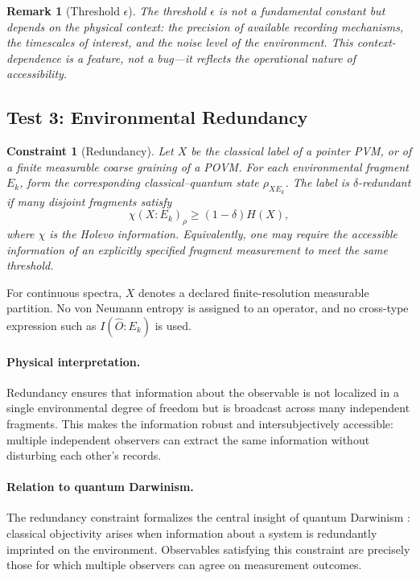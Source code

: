 \documentclass[12pt,a4paper]{article}
\newtheorem{remark}[theorem]{Remark}
\newtheorem{constraint}[theorem]{Constraint}
\begin{document}
\begin{remark}[Threshold $\epsilon$]
The threshold $\epsilon$ is not a fundamental constant but depends on the physical context: the precision of available recording mechanisms, the timescales of interest, and the noise level of the environment. This context-dependence is a feature, not a bug---it reflects the operational nature of accessibility.
\end{remark}

\subsection{Test 3: Environmental Redundancy}

\begin{constraint}[Redundancy]
\label{const:redundancy}
Let $X$ be the classical label of a pointer PVM, or of a finite measurable coarse graining of a POVM.  For each environmental fragment $E_k$, form the corresponding classical--quantum state $\rho_{XE_k}$.  The label is $\delta$-redundant if many disjoint fragments satisfy
\begin{equation}
\chi(X:E_k)_{\rho}\ge(1-\delta)H(X),
\end{equation}
where $\chi$ is the Holevo information.  Equivalently, one may require the accessible information of an explicitly specified fragment measurement to meet the same threshold.
\end{constraint}

For continuous spectra, $X$ denotes a declared finite-resolution measurable partition.  No von Neumann entropy is assigned to an operator, and no cross-type expression such as $I(\hat O:E_k)$ is used.

\paragraph{Physical interpretation.}
Redundancy ensures that information about the observable is not localized in a single environmental degree of freedom but is broadcast across many independent fragments. This makes the information robust and intersubjectively accessible: multiple independent observers can extract the same information without disturbing each other's records.

\paragraph{Relation to quantum Darwinism.}
The redundancy constraint formalizes the central insight of quantum Darwinism \cite{Zurek2009}: classical objectivity arises when information about a system is redundantly imprinted on the environment. Observables satisfying this constraint are precisely those for which multiple observers can agree on measurement outcomes.
\end{document}
